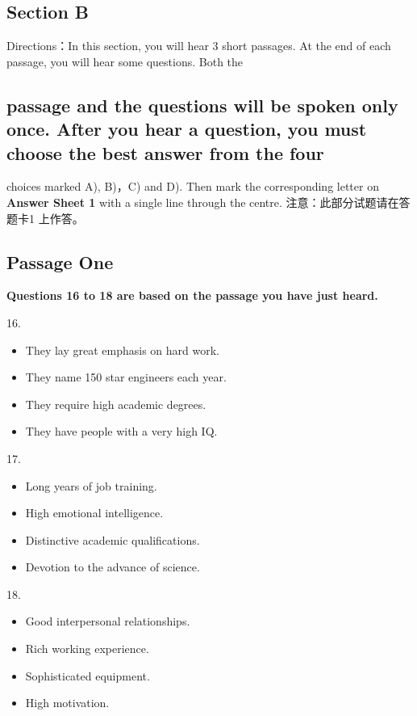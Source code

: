 \documentclass[UTF8,11pt]{ctexart}
\begin{document}
\subsection*{\textbf{Section B}}


Directions：In this section, you will hear 3 short passages. At the end of each passage, you will hear some questions. Both the


\subsection*{passage and the questions will be spoken only once. After you hear a question, you must choose the best answer from the four}


choices marked A), B)，C) and D). Then mark the corresponding letter on\textbf{ Answer Sheet 1} with a single line through the centre. 注意：此部分试题请在答题卡1 上作答。


\subsection*{\textbf{Passage One}}


\textbf{Questions 16 to 18 are based on the passage you have just heard.}


16.


\begin{itemize}[leftmargin=2em,itemsep=.2em,topsep=.4em]\item[A.] They lay great emphasis on hard work.
\item[B.] They name 150 star engineers each year.
\item[C.] They require high academic degrees.
\item[D.] They have people with a very high IQ.
\end{itemize}

17.


\begin{itemize}[leftmargin=2em,itemsep=.2em,topsep=.4em]\item[A.] Long years of job training.
\item[B.] High emotional intelligence.
\item[C.] Distinctive academic qualifications.
\item[D.] Devotion to the advance of science.
\end{itemize}

18.


\begin{itemize}[leftmargin=2em,itemsep=.2em,topsep=.4em]\item[A.] Good interpersonal relationships.
\item[B.] Rich working experience.
\item[C.] Sophisticated equipment.
\item[D.] High motivation.
\end{itemize}
\end{document}
